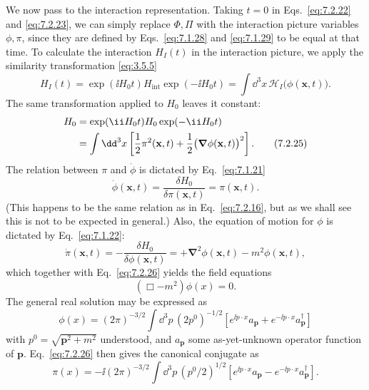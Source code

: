 We now pass to the interaction representation. Taking $t=0$ in
Eqs.~\eqref{eq:7.2.22} and \eqref{eq:7.2.23}, we can simply replace $\Phi,\Pi$ with the
interaction picture variables $\phi,\pi$, since they are defined by Eqs.~\eqref{eq:7.1.28} and
\eqref{eq:7.1.29} to be equal at that time. To calculate the interaction $H_I(t)$ in the
interaction picture, we apply the similarity transformation \eqref{eq:3.5.5}
\begin{equation}
H_I(t)=\exp(\ii H_0t)H_{\mathrm{int}}\exp(-\ii H_0t)
=\int \dd^3x\,\mathcal{H}_I\bigl(\phi(\mathbf{x},t)\bigr).
\tag{7.2.24}\label{eq:7.2.24}
\end{equation}
The same transformation applied to $H_0$ leaves it constant:
\begin{align}
H_0&=\exp(\ii H_0t)H_0\exp(-\ii H_0t)
\notag\\
&=\int \dd^3x\left[\frac12\pi^2(\mathbf{x},t)
+\frac12\bigl(\boldsymbol{\nabla}\phi(\mathbf{x},t)\bigr)^2\right].
\tag{7.2.25}\label{eq:7.2.25}
\end{align}
The relation between $\pi$ and $\dot\phi$ is dictated by Eq.~\eqref{eq:7.1.21}
\begin{equation}
\dot\phi(\mathbf{x},t)=\frac{\delta H_0}{\delta\pi(\mathbf{x},t)}
=\pi(\mathbf{x},t).
\tag{7.2.26}\label{eq:7.2.26}
\end{equation}
(This happens to be the same relation as in Eq.~\eqref{eq:7.2.16}, but as we shall
see this is not to be expected in general.) Also, the equation of motion for
$\phi$ is dictated by Eq.~\eqref{eq:7.1.22}:
\begin{equation}
\dot\pi(\mathbf{x},t)=-\frac{\delta H_0}{\delta\phi(\mathbf{x},t)}
=+\boldsymbol{\nabla}^2\phi(\mathbf{x},t)-m^2\phi(\mathbf{x},t),
\tag{7.2.27}\label{eq:7.2.27}
\end{equation}
which together with Eq.~\eqref{eq:7.2.26} yields the field equations
\begin{equation}
(\Box-m^2)\phi(x)=0.
\tag{7.2.28}\label{eq:7.2.28}
\end{equation}
The general real solution may be expressed as
\begin{equation}
\phi(x)=(2\pi)^{-3/2}\int \dd^3p\,(2p^0)^{-1/2}
\left[e^{\ii p\cdot x}a_{\mathbf{p}}+e^{-\ii p\cdot x}a^\dagger_{\mathbf{p}}\right]
\tag{7.2.29}\label{eq:7.2.29}
\end{equation}
with $p^0=\sqrt{\mathbf{p}^2+m^2}$ understood, and $a_{\mathbf{p}}$ some
as-yet-unknown operator function of $\mathbf{p}$. Eq.~\eqref{eq:7.2.26} then gives the
canonical conjugate as
\begin{equation}
\pi(x)=-\ii(2\pi)^{-3/2}\int \dd^3p\,(p^0/2)^{1/2}
\left[e^{\ii p\cdot x}a_{\mathbf{p}}-e^{-\ii p\cdot x}a^\dagger_{\mathbf{p}}\right].
\tag{7.2.30}\label{eq:7.2.30}
\end{equation}
